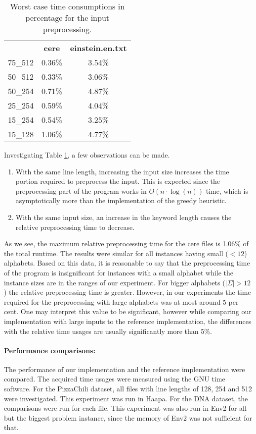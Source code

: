 \documentclass[english,twoside,censored,csm,algorithms-track-2020]{HYthesisML}
\theoremstyle{plain}
\theoremstyle{definition}
\numberwithin{testexample}{chapter}
\begin{document}
\begin{table}
\begin{centering}
\begin{tabular}{l | c c}
  & \textbf{cere} & \textbf{einstein.en.txt} \\
  75\_512 & 0.36\% & 3.54\% \\
  50\_512 & 0.33\% & 3.06\% \\
  50\_254 & 0.71\% & 4.87\% \\
  25\_254 & 0.59\% & 4.04\% \\
  15\_254 & 0.54\% & 3.25\% \\
  15\_128 & 1.06\% & 4.77\% \\
\end{tabular}
  \caption{Worst case time consumptions in percentage for the input preprocessing.}
  \label{table-duplicate-time}
\end{centering}
\end{table}
Investigating Table \ref{table-duplicate-time}, a few observations can be made.

\begin{enumerate}
\item With the same line length, increasing the input size increases the time portion required to preprocess the input. This is expected since the preprocessing part of the program works in $O(n\cdot\log(n))$ time, which is asymptotically more than the implementation of the greedy heuristic.
\item With the same input size, an increase in the keyword length causes the relative preprocessing time to decrease. 
\end{enumerate}

As we see, the maximum relative preprocessing time for the cere files is 1.06\% of the total runtime.
The results were similar for all instances having small ($<12$) alphabets. Based on this data,
it is reasonable to say that the preprocessing time of the program is insignificant for instances
with a small alphabet while the instance sizes are in the ranges of our experiment. For bigger
alphabets ($|\Sigma|>12$) the relative preprocessing time is greater. However, in our experiments
the time required for the preprocessing with large alphabets was at most around 5 per cent. One may
interpret this value to be significant, however while comparing our implementation with large
inputs to the reference implementation, the differences with the relative time usages are usually
significantly more than 5\%.


\paragraph{Performance comparisons:}
The performance of our implementation and the reference implementation were compared. The acquired
time usages were measured using the GNU time software. For the PizzaChili dataset, all files with line
lengths of 128, 254 and 512 were investigated. This experiment was run in Haapa. For the DNA dataset,
the comparisons were run for each file. This experiment was also run in Env2 for all but the
biggest problem instance, since the memory of Env2 was not sufficient for that.
\end{document}
